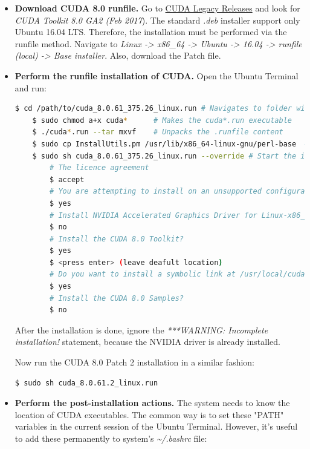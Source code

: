 \begin{itemize}
	\item \textbf{Download CUDA 8.0 runfile.} Go to \href{https://developer.nvidia.com/cuda-80-ga2-download-archive}{CUDA Legacy Releases} and look for \textit{CUDA Toolkit 8.0 GA2 (Feb 2017}). The standard \textit{.deb} installer support only Ubuntu 16.04 LTS. Therefore, the installation must be performed via the runfile method. Navigate to \textit{Linux -> x86\_64 -> Ubuntu -> 16.04 -> runfile (local) -> Base installer}. Also, download the Patch file. 
	
	\item \textbf{Perform the runfile installation of CUDA.} Open the Ubuntu Terminal and run: \cite{nvidia_dev}
	
	\begin{lstlisting}[language=bash]
	$ cd /path/to/cuda_8.0.61_375.26_linux.run # Navigates to folder with CUDA
	$ sudo chmod a+x cuda*		# Makes the cuda*.run executable
	$ ./cuda*.run --tar mxvf 	# Unpacks the .runfile content
	$ sudo cp InstallUtils.pm /usr/lib/x86_64-linux-gnu/perl-base  # Copy one of the extracted files to perl-base
	$ sudo sh cuda_8.0.61_375.26_linux.run --override # Start the installation 
		# The licence agreement
		$ accept 
		# You are attempting to install on an unsupported configuration. Do you wish to continue?
		$ yes 
		# Install NVIDIA Accelerated Graphics Driver for Linux-x86_64 375.26?
		$ no
		# Install the CUDA 8.0 Toolkit?
		$ yes 
		$ <press enter> (leave deafult location)
		# Do you want to install a symbolic link at /usr/local/cuda?
		$ yes
		# Install the CUDA 8.0 Samples?
		$ no
	\end{lstlisting}
	
	After the installation is done, ignore the \textit{***WARNING: Incomplete installation!} statement, because the NVIDIA driver is already installed. 
	
	Now run the CUDA 8.0 Patch 2 installation in a similar fashion:
	
	\begin{lstlisting}[language=bash]
	$ sudo sh cuda_8.0.61.2_linux.run
	\end{lstlisting}
	
	\item \textbf{Perform the post-installation actions.} The system needs to know the location of CUDA executables. The common way is to set these "PATH" variables in the current session of the Ubuntu Terminal. However, it's useful to add these permanently to system's \textit{\textasciitilde{}/.bashrc} file:
		

\end{itemize}
